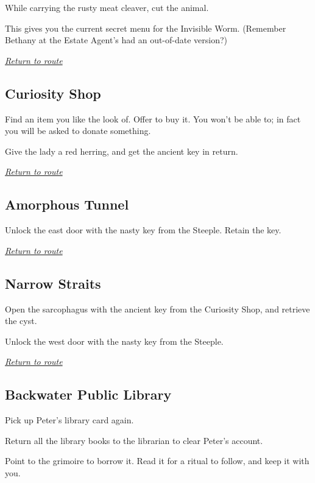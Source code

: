\documentclass[a5paper]{extarticle}
\begin{document}
While carrying the rusty meat cleaver, cut the animal.

This gives you the current secret menu for the Invisible Worm.
(Remember Bethany at the Estate Agent's had an out-of-date version?)

\hyperref[sec:route-11]{\emph{Return to route}}

\newpage
\subsection{Curiosity Shop}\label{sec:sol-Curiosity-Shop}

Find an item you like the look of. Offer to buy it.
You won't be able to; in fact you will be asked to donate something.

Give the lady a red herring, and get the ancient key in return.

\hyperref[sec:route-12]{\emph{Return to route}}

\newpage
\subsection{Amorphous Tunnel}\label{sec:sol-Amorphous-Tunnel}

Unlock the east door with the nasty key from the Steeple. Retain the key.

\hyperref[sec:route-12]{\emph{Return to route}}

\newpage
\subsection{Narrow Straits}\label{sec:sol-Narrow-Straits}

Open the sarcophagus with the ancient key from the Curiosity Shop, and retrieve the cyst.

Unlock the west door with the nasty key from the Steeple.

\hyperref[sec:route-12]{\emph{Return to route}}

\newpage
\subsection{Backwater Public Library}\label{sec:sol-Backwater-Public-Library}

Pick up Peter's library card again.

Return all the library books to the librarian to clear Peter's account.

Point to the grimoire to borrow it.
Read it for a ritual to follow, and keep it with you.
\end{document}
